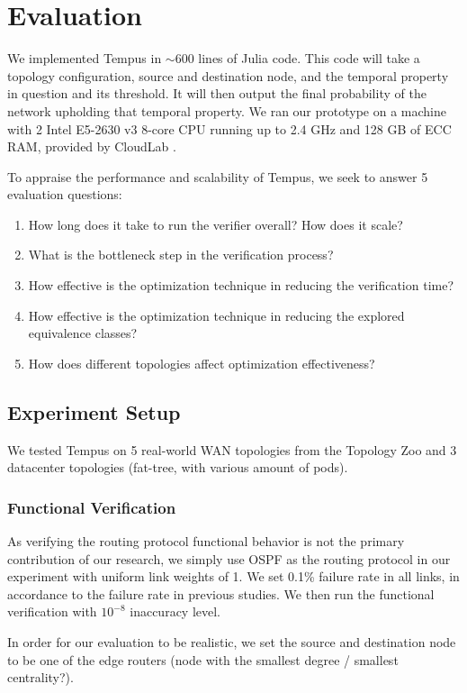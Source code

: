 \section{Evaluation}

We implemented Tempus in $\sim600$ lines of Julia \cite{julia} code.
This code will take a topology configuration, source and destination node, and the 
temporal property in question and its threshold.
It will then output the final probability of the network upholding that temporal property.
We ran our prototype on a machine with 2 Intel E5-2630 v3 8-core CPU running up to 2.4 GHz 
and 128 GB of ECC RAM, provided by CloudLab \cite{cloudlab}.

To appraise the performance and scalability of Tempus, we seek to answer 5 evaluation questions:
\begin{enumerate}
    \item How long does it take to run the verifier overall? How does it scale?
    \item What is the bottleneck step in the verification process?
    \item How effective is the optimization technique in reducing the verification time?
    \item How effective is the optimization technique in reducing the explored equivalence classes?
    \item How does different topologies affect optimization effectiveness?
\end{enumerate}

\subsection{Experiment Setup}
We tested Tempus on 5 real-world WAN topologies from the Topology Zoo and 3 datacenter topologies 
(fat-tree, with various amount of pods).

\subsubsection{Functional Verification}
As verifying the routing protocol functional behavior is not the primary contribution of our research, 
we simply use OSPF as the routing protocol in our experiment with uniform link weights of 1.
We set 0.1\% failure rate in all links, in accordance to the failure rate in previous studies. %
We then run the functional verification with $10^{-8}$ inaccuracy level.

In order for our evaluation to be realistic, we set the source and destination node to be one of the 
edge routers (node with the smallest degree / smallest centrality?).

